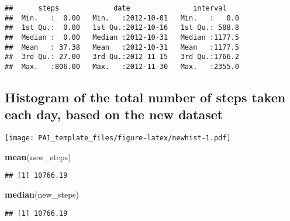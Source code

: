 \documentclass[]{article}
\newenvironment{Shaded}{\begin{snugshade}}{\end{snugshade}}
\newcommand{\KeywordTok}[1]{\textcolor[rgb]{0.13,0.29,0.53}{\textbf{{#1}}}}
\newcommand{\DataTypeTok}[1]{\textcolor[rgb]{0.13,0.29,0.53}{{#1}}}
\newcommand{\StringTok}[1]{\textcolor[rgb]{0.31,0.60,0.02}{{#1}}}
\newcommand{\NormalTok}[1]{{#1}}
\begin{document}
\begin{verbatim}
##      steps             date               interval     
##  Min.   :  0.00   Min.   :2012-10-01   Min.   :   0.0  
##  1st Qu.:  0.00   1st Qu.:2012-10-16   1st Qu.: 588.8  
##  Median :  0.00   Median :2012-10-31   Median :1177.5  
##  Mean   : 37.38   Mean   :2012-10-31   Mean   :1177.5  
##  3rd Qu.: 27.00   3rd Qu.:2012-11-15   3rd Qu.:1766.2  
##  Max.   :806.00   Max.   :2012-11-30   Max.   :2355.0
\end{verbatim}

\subsection{Histogram of the total number of steps taken each day, based
on the new
dataset}\label{histogram-of-the-total-number-of-steps-taken-each-day-based-on-the-new-dataset}

\begin{Shaded}
\end{Shaded}

\texttt{[image: PA1\_template\_files/figure-latex/newhist-1.pdf]}

\begin{Shaded}
\begin{Highlighting}[]
\KeywordTok{mean}\NormalTok{(new_steps)}
\end{Highlighting}
\end{Shaded}

\begin{verbatim}
## [1] 10766.19
\end{verbatim}

\begin{Shaded}
\begin{Highlighting}[]
\KeywordTok{median}\NormalTok{(new_steps)}
\end{Highlighting}
\end{Shaded}

\begin{verbatim}
## [1] 10766.19
\end{verbatim}
\end{document}
